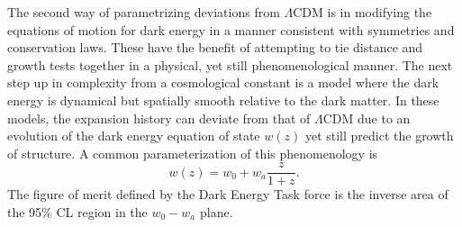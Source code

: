 The second way of parametrizing deviations from $\Lambda$CDM is in modifying the equations of motion for dark energy in a manner consistent with symmetries and conservation laws.   These have the benefit of attempting to tie distance and growth
tests together in a physical, yet still phenomenological manner.    The next step up in
complexity from a cosmological constant is a model where the dark energy is dynamical
but spatially smooth relative to the dark matter.   In these models, the expansion history
can deviate from that of $\Lambda$CDM due to an evolution of the dark energy
equation of state $w(z)$ yet still predict the growth of structure.   A common parameterization
of this phenomenology is
\begin{equation}
w(z) = w_0 + w_a \frac{z}{1+z}.
\end{equation}
The figure of merit defined by the Dark Energy Task force is the inverse area of the
95\% CL region in the $w_0-w_a$ plane.  

